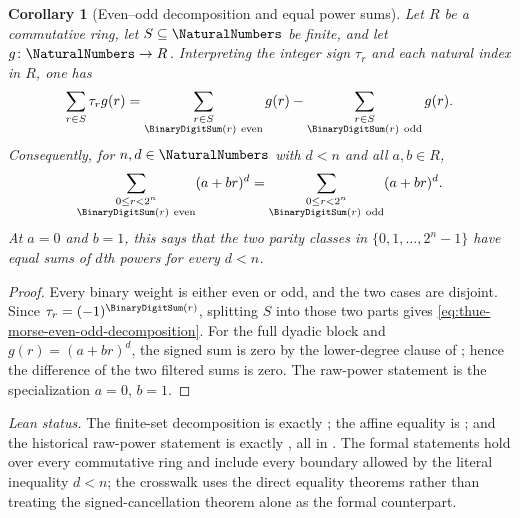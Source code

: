 \documentclass[11pt,a4paper,oneside,openany]{book}
\newtheorem{corollary}[corollary]{Corollary}
\theoremstyle{definition}
\theoremstyle{remark}
\begin{document}
\begin{corollary}[Even--odd decomposition and equal power sums]\label{cor:thue-morse-prouhet-partition}
Let $R$ be a commutative ring, let $S\subseteq\NaturalNumbers$ be finite, and
let $g\colon\NaturalNumbers\to R$.  Interpreting the integer sign $\tau_r$ and
each natural index in $R$, one has
\begin{equation}\label{eq:thue-morse-even-odd-decomposition}
 \sum_{r\in S}\tau_r g(r)
 =\sum_{\substack{r\in S\\ \BinaryDigitSum(r)\ \mathrm{even}}}g(r)
  -\sum_{\substack{r\in S\\ \BinaryDigitSum(r)\ \mathrm{odd}}}g(r).
\end{equation}
Consequently, for $n,d\in\NaturalNumbers$ with $d<n$ and all $a,b\in R$,
\begin{equation}\label{eq:thue-morse-prouhet-affine-partition}
 \sum_{\substack{0\le r<2^n\\ \BinaryDigitSum(r)\ \mathrm{even}}}(a+br)^d
 =\sum_{\substack{0\le r<2^n\\ \BinaryDigitSum(r)\ \mathrm{odd}}}(a+br)^d.
\end{equation}
At $a=0$ and $b=1$, this says that the two parity classes in
$\{0,1,\ldots,2^n-1\}$ have equal sums of $d$th powers for every $d<n$.
\end{corollary}

\begin{proof}
Every binary weight is either even or odd, and the two cases are disjoint.
Since $\tau_r=(-1)^{\BinaryDigitSum(r)}$, splitting $S$ into those two parts
gives \eqref{eq:thue-morse-even-odd-decomposition}.  For the full dyadic block
and $g(r)=(a+br)^d$, the signed sum is zero by the lower-degree clause of
; hence the difference of the two filtered sums
is zero.  The raw-power statement is the specialization $a=0$, $b=1$.
\end{proof}
\emph{Lean status.}  The finite-set decomposition is exactly
;
the affine equality is
;
and the historical raw-power statement is exactly
, all in
.  The formal statements hold over every
commutative ring and include every boundary allowed by the literal inequality
$d<n$; the crosswalk uses the direct equality theorems rather than treating
the signed-cancellation theorem alone as the formal counterpart.
\end{document}
